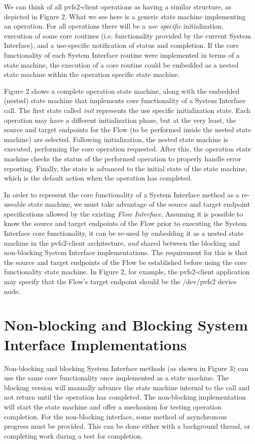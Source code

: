\documentclass[11pt]{article}
\begin{document}
We can think of all pvfs2-client operations as having a similar
structure, as depicted in Figure 2.  What we see here is a generic
state machine implementing an operation.  For all operations there
will be a {\it use specific} initialization, execution of some core
routines (i.e. functionality provided by the current System
Interface), and a use-specific notification of status and completion.
If the core functionality of each System Interface routine were
implemented in terms of a state machine, the execution of a core
routine could be embedded as a nested state machine within the
operation specific state machine.

Figure 2 shows a complete operation state machine, along with the
embedded (nested) state machine that implements core functionality of
a System Interface call.  The first state called {\it init} represents
the use specific initialization state.  Each operation may have a
different initialization phase, but at the very least, the source and
target endpoints for the Flow (to be performed inside the nested state
machine) are selected.  Following initialization, the nested state
machine is executed, performing the core operation requested.  After
this, the operation state machine checks the status of the performed
operation to properly handle error reporting.  Finally, the state is
advanced to the initial state of the state machine, which is the
default action when the operation has completed.

In order to represent the core functionality of a System Interface
method as a re-useable state machine, we must take advantage of the
source and target endpoint specifications allowed by the existing {\it
Flow Interface}.  Assuming it is possible to know the source and
target endpoints of the Flow prior to executing the System Interface
core functionality, it can be re-used by embedding it as a nested
state machine in the pvfs2-client architecture, {\it and} shared
between the blocking and non-blocking System Interface
implementations.  The requirement for this is that the source and
target endpoints of the Flow be established before using the core
functionality state machine.  In Figure 2, for example, the
pvfs2-client application may specify that the Flow's target endpoint
should be the /dev/pvfs2 device node.

\section{Non-blocking and Blocking System Interface Implementations}

Non-blocking and blocking System Interface methods (as shown in Figure
3) can use the same core functionality once implemented as a state
machine.  The blocking version will manually advance the state machine
internal to the call and not return until the operation has completed.
The non-blocking implementation will start the state machine and offer
a mechanism for testing operation completion.  For the non-blocking
interface, some method of asynchronous progress must be provided.
This can be done either with a background thread, or completing work
during a test for completion.
\end{document}
